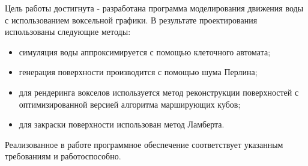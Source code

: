 \Conclusion %


Цель работы достигнута - разработана программа моделирования движения воды
с использованием воксельной графики. В результате проектирования использованы следующие методы:
\begin{itemize}
    \item симуляция воды аппроксимируется с помощью клеточного автомата;
    \item генерация поверхности производится с помощью шума Перлина;
    \item для рендеринга вокселов используется метод реконструкции поверхностей с
    оптимизированной версией алгоритма марширующих кубов;
    \item для закраски поверхности использован метод Ламберта.
\end{itemize}

Реализованное в работе программное обеспечение соответствует указанным требованиям
и работоспособно.

